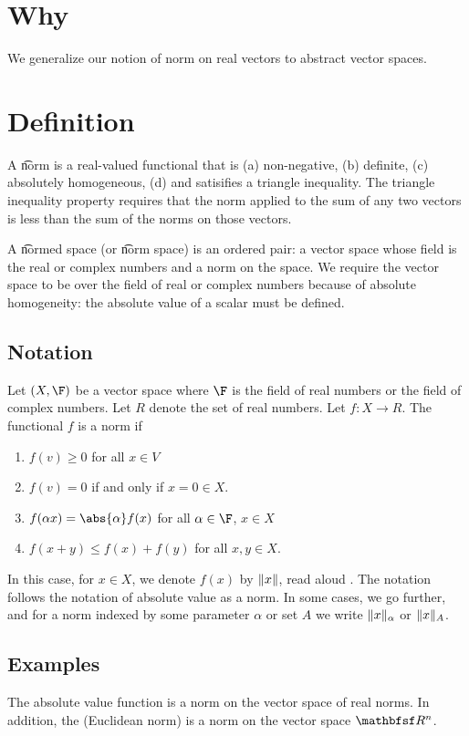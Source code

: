 

\section*{Why}

We generalize our notion of norm on real vectors to abstract vector spaces.

\section*{Definition}

A \t{norm} is a real-valued functional that is
(a) non-negative,
(b) definite,
(c) absolutely homogeneous,
(d) and satisifies a triangle inequality.
The triangle inequality property requires that the norm applied to the sum of any two vectors is less than the sum of the norms on those vectors.

A \t{normed space} (or \t{norm space}) is an ordered pair: a vector space whose field is the real or complex numbers and a norm on the space.
We require the vector space to be over the field of real or complex numbers because of absolute homogeneity: the absolute value of a scalar must be defined.

\subsection*{Notation}

Let $(X, \F )$ be a vector space where $\F $ is the field of real numbers or the field of complex numbers.
Let $R$ denote the set of real numbers.
Let $f: X \to R$.
The functional $f$ is a norm if
    \begin{enumerate}
      \item $f(v) \geq 0$ for all $x \in V$
      \item $f(v) = 0$ if and only if $x = 0 \in X$.
      \item $f(\alpha  x) = \abs{\alpha }f(x)$ for all $\alpha \in \F $, $x \in X$
      \item $f(x + y) \leq f(x) + f(y)$ for all $x, y \in X$.
    \end{enumerate}

In this case, for $x \in X$, we denote $f(x)$ by $\lVert x\rVert$, read aloud .
The notation follows the notation of absolute value as a norm.
In some cases, we go further, and for a norm indexed by some parameter $\alpha $ or set $A$ we write $\lVert x\rVert_\alpha $ or $\lVert x\rVert_A$.

\subsection*{Examples}

The absolute value function is a norm on the vector space of real norms.
In addition, the (Euclidean norm) is a norm on the vector space $\R ^n$.
